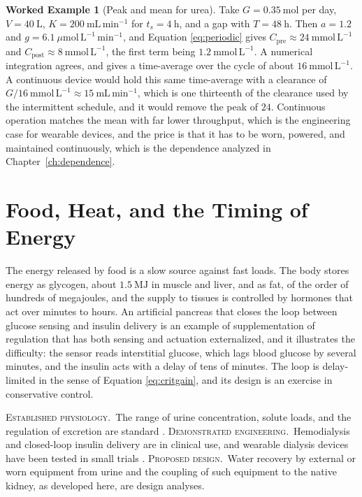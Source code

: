 \documentclass[11pt,openany]{book}
\theoremstyle{definition}
\newtheorem{example}{Worked Example}[chapter]
\theoremstyle{remark}
\newcommand{\est}{\textsc{Established physiology.}\ }
\newcommand{\dem}{\textsc{Demonstrated engineering.}\ }
\newcommand{\pro}{\textsc{Proposed design.}\ }
\begin{document}
\begin{example}[Peak and mean for urea]
\label{ex:sawtooth}
Take $G=0.35\ \mathrm{mol}$ per day, $V=40\ \mathrm{L}$, $K=200\ \mathrm{mL\,min^{-1}}$ for $t_s=4\ \mathrm{h}$, and a gap with $T=48\ \mathrm{h}$. Then $a=1.2$ and $g=6.1\ \mu\mathrm{mol\,L^{-1}\,min^{-1}}$, and Equation \eqref{eq:periodic} gives $C_{\mathrm{pre}}\approx24\ \mathrm{mmol\,L^{-1}}$ and $C_{\mathrm{post}}\approx8\ \mathrm{mmol\,L^{-1}}$, the first term being $1.2\ \mathrm{mmol\,L^{-1}}$. A numerical integration agrees, and gives a time-average over the cycle of about $16\ \mathrm{mmol\,L^{-1}}$. A continuous device would hold this same time-average with a clearance of $G/16\ \mathrm{mmol\,L^{-1}}\approx15\ \mathrm{mL\,min^{-1}}$, which is one thirteenth of the clearance used by the intermittent schedule, and it would remove the peak of $24$. Continuous operation matches the mean with far lower throughput, which is the engineering case for wearable devices, and the price is that it has to be worn, powered, and maintained continuously, which is the dependence analyzed in Chapter~\ref{ch:dependence}.
\end{example}

\section{Food, Heat, and the Timing of Energy}

The energy released by food is a slow source against fast loads. The body stores energy as glycogen, about $1.5\ \mathrm{MJ}$ in muscle and liver, and as fat, of the order of hundreds of megajoules, and the supply to tissues is controlled by hormones that act over minutes to hours. An artificial pancreas that closes the loop between glucose sensing and insulin delivery is an example of supplementation of regulation that has both sensing and actuation externalized, and it illustrates the difficulty: the sensor reads interstitial glucose, which lags blood glucose by several minutes, and the insulin acts with a delay of tens of minutes. The loop is delay-limited in the sense of Equation \eqref{eq:critgain}, and its design is an exercise in conservative control.

\begin{evidence}
\est The range of urine concentration, solute loads, and the regulation of excretion are standard \cite{boron2017,guyton2021}. \dem Hemodialysis and closed-loop insulin delivery are in clinical use, and wearable dialysis devices have been tested in small trials \cite{gura2016}. \pro Water recovery by external or worn equipment from urine and the coupling of such equipment to the native kidney, as developed here, are design analyses.
\end{evidence}
\end{document}
